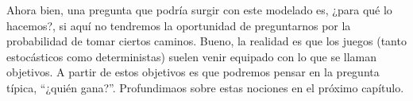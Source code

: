 Ahora bien, una pregunta que podría surgir con este modelado es, ¿para qué lo
hacemos?, si aquí no tendremos la oportunidad de preguntarnos por la
probabilidad de tomar ciertos caminos. Bueno, la realidad es que los juegos
(tanto estocásticos como deterministas) suelen venir equipado con lo que se
llaman objetivos. A partir de estos objetivos es que podremos pensar en la
pregunta típica, ``¿quién gana?''. Profundimaos sobre estas nociones en el
próximo capítulo.





